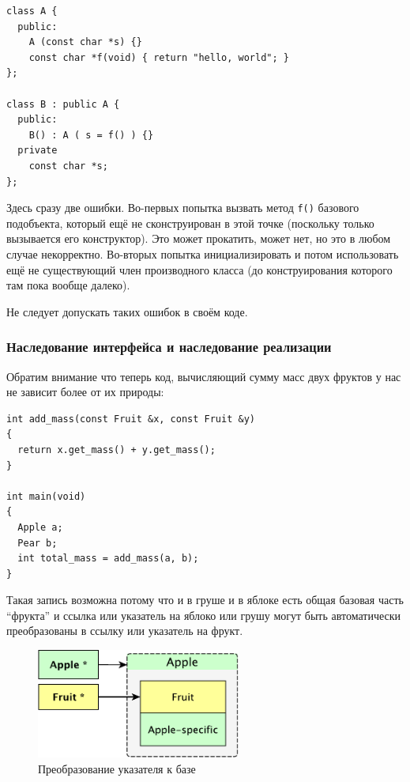 \documentclass[a4paper,12pt,oneside]{article}
\begin{document}
\begin{lstlisting}
class A {
  public:
    A (const char *s) {}
    const char *f(void) { return "hello, world"; }
};

class B : public A {
  public:
    B() : A ( s = f() ) {}
  private
    const char *s;
};
\end{lstlisting}

Здесь сразу две ошибки. Во-первых попытка вызвать метод \lstinline!f()! базового подобъекта, который ещё не сконструирован в этой точке (поскольку только вызывается его конструктор). Это может прокатить, может нет, но это в любом случае некорректно. Во-вторых попытка инициализировать и потом использовать ещё не существующий член производного класса (до конструирования которого там пока вообще далеко).

Не следует допускать таких ошибок в своём коде.

\subsubsection{Наследование интерфейса и наследование реализации}

Обратим внимание что теперь код, вычисляющий сумму масс двух фруктов у нас не зависит более от их природы:

\begin{lstlisting}
int add_mass(const Fruit &x, const Fruit &y)
{
  return x.get_mass() + y.get_mass();
}

int main(void)
{
  Apple a;
  Pear b;
  int total_mass = add_mass(a, b);
}
\end{lstlisting}

Такая запись возможна потому что и в груше и в яблоке есть общая базовая часть ``фрукта'' и ссылка или указатель на яблоко или грушу могут быть автоматически преобразованы в ссылку или указатель на фрукт.

\begin{figure}[h!]
\centering
\includegraphics[width=0.6\textwidth]{illustrations/fruitptr-crop.pdf}
\caption{Преобразование указателя к базе}
\label{fig:fruitptr-crop}
\end{figure}
\end{document}
